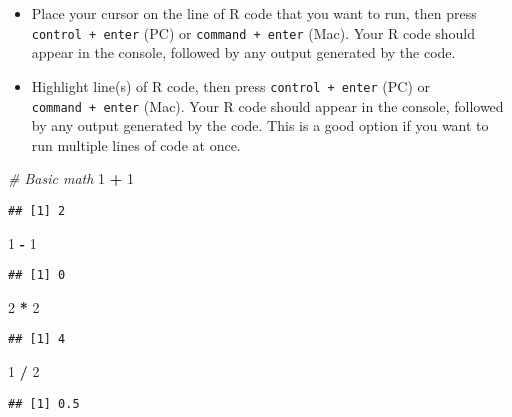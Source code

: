 \documentclass[]{article}
\newenvironment{Shaded}{\begin{snugshade}}{\end{snugshade}}
\newcommand{\DecValTok}[1]{\textcolor[rgb]{0.00,0.00,0.81}{#1}}
\newcommand{\StringTok}[1]{\textcolor[rgb]{0.31,0.60,0.02}{#1}}
\newcommand{\CommentTok}[1]{\textcolor[rgb]{0.56,0.35,0.01}{\textit{#1}}}
\newcommand{\OperatorTok}[1]{\textcolor[rgb]{0.81,0.36,0.00}{\textbf{#1}}}
\begin{document}
\begin{itemize}
\item
  Place your cursor on the line of R code that you want to run, then
  press \texttt{control\ +\ enter} (PC) or \texttt{command\ +\ enter}
  (Mac). Your R code should appear in the console, followed by any
  output generated by the code.
\item
  Highlight line(s) of R code, then press \texttt{control\ +\ enter}
  (PC) or \texttt{command\ +\ enter} (Mac). Your R code should appear in
  the console, followed by any output generated by the code. This is a
  good option if you want to run multiple lines of code at once.
\end{itemize}

\begin{Shaded}
\begin{Highlighting}[]
\CommentTok{# Basic math}
\DecValTok{1} \OperatorTok{+}\StringTok{ }\DecValTok{1}
\end{Highlighting}
\end{Shaded}

\begin{verbatim}
## [1] 2
\end{verbatim}

\begin{Shaded}
\begin{Highlighting}[]
\DecValTok{1} \OperatorTok{-}\StringTok{ }\DecValTok{1}
\end{Highlighting}
\end{Shaded}

\begin{verbatim}
## [1] 0
\end{verbatim}

\begin{Shaded}
\begin{Highlighting}[]
\DecValTok{2} \OperatorTok{*}\StringTok{ }\DecValTok{2}
\end{Highlighting}
\end{Shaded}

\begin{verbatim}
## [1] 4
\end{verbatim}

\begin{Shaded}
\begin{Highlighting}[]
\DecValTok{1} \OperatorTok{/}\StringTok{ }\DecValTok{2}
\end{Highlighting}
\end{Shaded}

\begin{verbatim}
## [1] 0.5
\end{verbatim}
\end{document}
